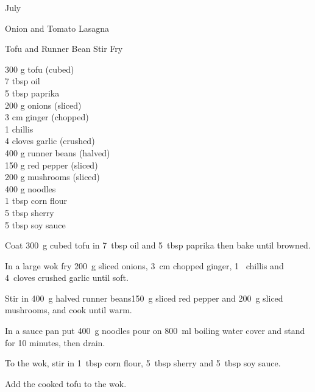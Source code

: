 \begin{menu}{July}
\begin{recipe}{2}{Onion and Tomato Lasagna}
\begin{instructions}
    \end{instructions}
    \end{recipe}%
  
    \begin{recipe}{2}{Tofu and Runner Bean Stir Fry}%
		\begin{ingredients}
		300 g tofu (cubed) \\
	7 tbsp oil  \\
	5 tbsp paprika  \\
	200 g onions (sliced) \\
	3 cm ginger (chopped) \\
	1  chillis  \\
	4 cloves garlic (crushed) \\
	400 g runner beans (halved) \\
	150 g red pepper (sliced) \\
	200 g mushrooms (sliced) \\
	400 g noodles  \\
	1 tbsp corn flour  \\
	5 tbsp sherry  \\
	5 tbsp soy sauce  \\
	
		\end{ingredients}
	
	
    \begin{instructions}
    \item 
        Coat
        300~g cubed tofu
        in
        7~tbsp  oil
        and
        5~tbsp  paprika
        then bake until browned.
      \item 
        In a large wok fry 200~g sliced onions,
        3~cm chopped ginger,
        1~  chillis
        and
        4~cloves crushed garlic
        until soft.
      \item 
        Stir in
        400~g halved runner beans150~g sliced red pepper
        and
        200~g sliced mushrooms,
        and cook until warm.
      \item 
      In a sauce pan
      put
      400~g  noodles
      pour on
      800~ml  boiling water
      cover and stand for 10 minutes, then drain.
    \item 
        To the wok, stir in
        1~tbsp  corn flour,
        5~tbsp  sherry
        and
        5~tbsp  soy sauce.
      \item 
        Add the cooked tofu to the wok.
      

\end{instructions}
\end{recipe}
\end{menu}
